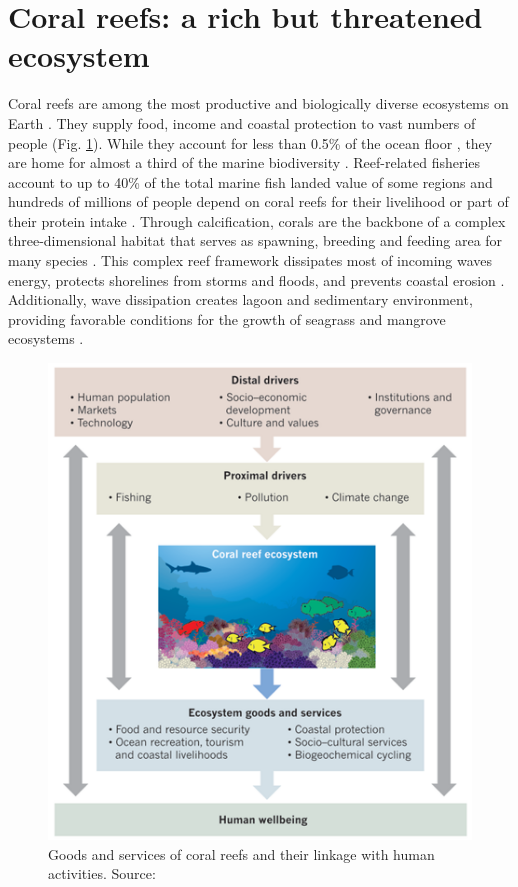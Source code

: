\section{Coral reefs: a rich but threatened ecosystem}

Coral reefs are among the most productive and biologically diverse ecosystems on Earth \citep{connell1978diversity, moberg1999ecological}. They supply food, income and coastal protection to vast numbers of people (Fig. \ref{intro:corals}). While they account for less than 0.5\% of the ocean floor \citep{spalding1997new}, they are home for almost a third of the marine biodiversity \citep{moberg1999ecological}. Reef-related fisheries account to up to 40\% of the total marine
fish landed value of some regions \citep{teh2013global} and hundreds of millions of people depend on coral reefs for their livelihood or part of their protein intake \citep{salvat1992coral,hoegh2019people}. Through calcification, corals are the backbone of a complex three-dimensional habitat that serves as spawning, breeding and feeding area for many species \citep{moberg1999ecological,rogers2014vulnerability}. This complex reef framework  dissipates most of incoming waves energy, protects shorelines from storms and floods, and prevents coastal erosion \citep{ferrario2014effectiveness,elliff2017coral}. Additionally, wave dissipation creates lagoon and sedimentary environment, providing favorable conditions for the growth of seagrass and mangrove ecosystems \citep{moberg1999ecological,guannel2016power}.

\begin{figure}
    \centering
    \includegraphics[width=.8\textwidth]{chapters/intro/figures/anthropocene.png}
    \caption{Goods and services of coral reefs and their linkage with human activities. Source: \cite{hughes2017coral}}
    \label{intro:corals}
\end{figure}

